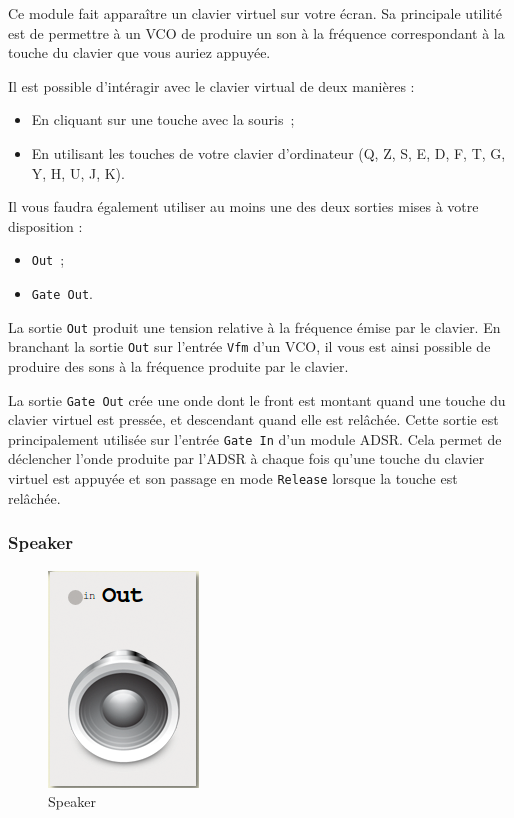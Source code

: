 \documentclass[a4paper,oneside,frenchb,12pt]{article}
\begin{document}
Ce module fait apparaître un clavier virtuel sur votre écran. Sa
principale utilité est de permettre à un VCO de produire un son à la
fréquence correspondant à la touche du clavier que vous auriez appuyée.

Il est possible d'intéragir avec le clavier virtual de deux manières :

\begin{itemize}
\item
  En cliquant sur une touche avec la souris~;
\item
  En utilisant les touches de votre clavier d'ordinateur (Q, Z, S, E, D,
  F, T, G, Y, H, U, J, K).
\end{itemize}
Il vous faudra également utiliser au moins une des deux sorties mises à
votre disposition :

\begin{itemize}
\item
  \verb!Out!~;
\item
  \verb!Gate Out!.
\end{itemize}
La sortie \verb!Out! produit une tension relative à la fréquence émise
par le clavier. En branchant la sortie \verb!Out! sur l'entrée
\verb!Vfm! d'un VCO, il vous est ainsi possible de produire des sons à
la fréquence produite par le clavier.

La sortie \verb!Gate Out! crée une onde dont le front est montant quand
une touche du clavier virtuel est pressée, et descendant quand elle est
relâchée. Cette sortie est principalement utilisée sur l'entrée
\verb!Gate In! d'un module ADSR. Cela permet de déclencher l'onde
produite par l'ADSR à chaque fois qu'une touche du clavier virtuel est
appuyée et son passage en mode \verb!Release! lorsque la touche est
relâchée.

\subsubsection{Speaker}

\begin{figure}[h!]
\centering
\includegraphics[scale=0.5]{../img/png/speaker.png}
\caption{Speaker}
\end{figure}
\end{document}
